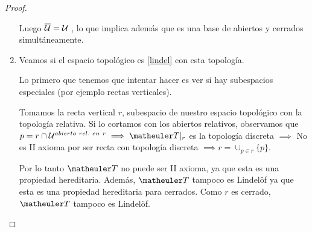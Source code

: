 \begin{proof}
\begin{enumerate}
		Luego  $\overline{\mathcal{U}} = \mathcal{U}$ , lo que implica además que es una base de abiertos y cerrados simultáneamente.
		
		\item Veamos si el espacio topológico es  \ref{lindel} con esta topología.
		
		Lo primero que tenemos que intentar hacer es ver si hay subespacios especiales (por ejemplo rectas verticales).
		
		Tomamos la recta vertical $r$, subespacio de nuestro espacio topológico con la topología relativa. Si lo cortamos con los abiertos relativos, observamos que $p = r \cap \U^{abierto\ rel.\ en\ r} \implies \T|_r$ es la topología discreta $\implies$ No es II axioma por ser recta con topología discreta $\implies r= \cup_{p\in r}\{p\}$.
		
		Por lo tanto $\T$ no puede ser II axioma, ya que esta es una propiedad hereditaria. Además, $\T$ tampoco es Lindelöf ya que esta es una propiedad hereditaria para cerrados. Como $r$ es cerrado, $\T$ tampoco es Lindelöf.
	\end{enumerate}	
\end{proof}